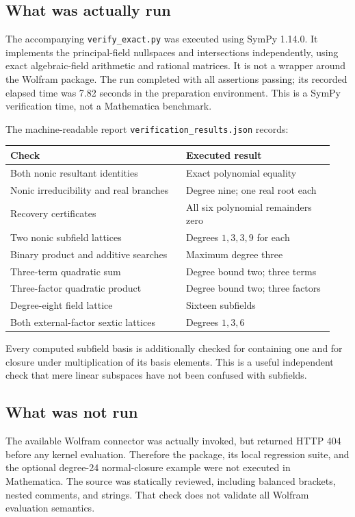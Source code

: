 \documentclass[11pt,letterpaper]{article}
\theoremstyle{definition}
\theoremstyle{remark}
\newcommand{\wl}[1]{\texttt{#1}}
\begin{document}
\subsection{What was actually run}
The accompanying \wl{verify\_exact.py} was executed using SymPy 1.14.0.
It implements the principal-field nullspaces and intersections independently,
using exact algebraic-field arithmetic and rational matrices. It is not a
wrapper around the Wolfram package. The run completed with all assertions
passing; its recorded elapsed time was 7.82 seconds in the preparation
environment. This is a SymPy verification time, not a Mathematica benchmark.

The machine-readable report \wl{verification\_results.json} records:
\begin{center}
\begin{tabular}{@{}p{0.51\linewidth}p{0.43\linewidth}@{}}
\toprule
\textbf{Check} & \textbf{Executed result}\\\midrule
Both nonic resultant identities & Exact polynomial equality\\
Nonic irreducibility and real branches & Degree nine; one real root each\\
Recovery certificates & All six polynomial remainders zero\\
Two nonic subfield lattices & Degrees \(1,3,3,9\) for each\\
Binary product and additive searches & Maximum degree three\\
Three-term quadratic sum & Degree bound two; three terms\\
Three-factor quadratic product & Degree bound two; three factors\\
Degree-eight field lattice & Sixteen subfields\\
Both external-factor sextic lattices & Degrees \(1,3,6\)\\
\bottomrule
\end{tabular}
\end{center}
Every computed subfield basis is additionally checked for containing one
and for closure under multiplication of its basis elements. This is a useful
independent check that mere linear subspaces have not been confused with
subfields.

\subsection{What was not run}
The available Wolfram connector was actually invoked, but returned HTTP 404
before any kernel evaluation. Therefore the package, its local regression
suite, and the optional degree-24 normal-closure example were not executed
in Mathematica. The source was statically reviewed, including balanced
brackets, nested comments, and strings. That check does not validate all
Wolfram evaluation semantics.
\end{document}
